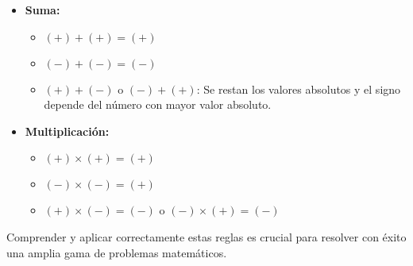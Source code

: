 \documentclass{article}
\begin{document}
\begin{itemize}
    \item \textbf{Suma:}
    \begin{itemize}
        \item \( (+) + (+) = (+) \)
        \item \( (-) + (-) = (-) \)
        \item \( (+) + (-) \) o \( (-) + (+) \): Se restan los valores absolutos y el signo depende del número con mayor valor absoluto.
    \end{itemize}

    \item \textbf{Multiplicación:}
    \begin{itemize}
        \item \( (+) \times (+) = (+) \)
        \item \( (-) \times (-) = (+) \)
        \item \( (+) \times (-) = (-) \) o \( (-) \times (+) = (-) \)
    \end{itemize}
\end{itemize}

Comprender y aplicar correctamente estas reglas es crucial para resolver con éxito una amplia gama de problemas matemáticos.
\end{document}
